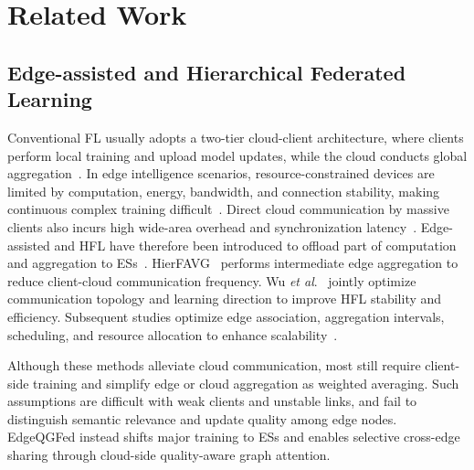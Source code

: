 ﻿\documentclass[10pt, conference, letterpaper]{ IEEEtran}
\begin{document}
\section{Related Work}
\label{section2}
\subsection{Edge-assisted and Hierarchical Federated Learning}
Conventional FL usually adopts a two-tier cloud-client architecture, where clients perform local training and upload model updates, while the cloud conducts global aggregation~\cite{mcmahan2017communication, Pei2026Adaptive}. In edge intelligence scenarios, resource-constrained devices are limited by computation, energy, bandwidth, and connection stability, making continuous complex training difficult~\cite{AbdelRaouf2026Paradigm}. Direct cloud communication by massive clients also incurs high wide-area overhead and synchronization latency~\cite{mahmoudi2025gptor}. Edge-assisted and HFL have therefore been introduced to offload part of computation and aggregation to ESs~\cite{Lin2025Hierarchical}. HierFAVG~\cite{liu2020client} performs intermediate edge aggregation to reduce client-cloud communication frequency. Wu \textit{et al}.~\cite{Wu2026Hierarchical} jointly optimize communication topology and learning direction to improve HFL stability and efficiency. Subsequent studies optimize edge association, aggregation intervals, scheduling, and resource allocation to enhance scalability~\cite{sun2026g,Trindade2026Multicriteria,li2026edge}.

Although these methods alleviate cloud communication, most still require client-side training and simplify edge or cloud aggregation as weighted averaging. Such assumptions are difficult with weak clients and unstable links, and fail to distinguish semantic relevance and update quality among edge nodes. EdgeQGFed instead shifts major training to ESs and enables selective cross-edge sharing through cloud-side quality-aware graph attention.
\end{document}
